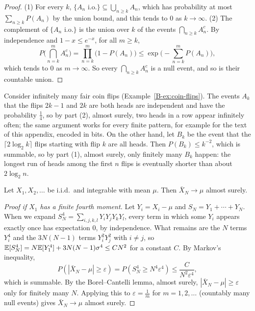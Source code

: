 \begin{proof}
    (1) For every $k$, $\{A_n \text{ i.o.}\} \subseteq \bigcup_{n \geq k} A_n$, which has probability at most $\sum_{n \geq k} P(A_n)$ by the union bound, and this tends to $0$ as $k \to \infty$. (2) The complement of $\{A_n \text{ i.o.}\}$ is the union over $k$ of the events $\bigcap_{n \geq k} A_n^c$. By independence and $1 - x \leq e^{-x}$, for all $m \geq k$,
    \[P\Big(\bigcap_{n=k}^m A_n^c\Big) = \prod_{n=k}^m \big(1 - P(A_n)\big) \leq \exp\Big(-\sum_{n=k}^m P(A_n)\Big),\]
    which tends to $0$ as $m \to \infty$. So every $\bigcap_{n \geq k} A_n^c$ is a null event, and so is their countable union.
\end{proof}

\begin{example}\label{B-ex:borel-cantelli}
    Consider infinitely many fair coin flips (Example~\ref{B-ex:coin-flips}). The events $A_k$ that the flips $2k - 1$ and $2k$ are both heads are independent and have the probability $\frac{1}{4}$, so by part (2), almost surely, two heads in a row appear infinitely often; the same argument works for every finite pattern, for example for the text of this appendix, encoded in bits. On the other hand, let $B_k$ be the event that the $\lceil 2\log_2 k\rceil$ flips starting with flip $k$ are all heads. Then $P(B_k) \leq k^{-2}$, which is summable, so by part (1), almost surely, only finitely many $B_k$ happen: the longest run of heads among the first $n$ flips is eventually shorter than about $2\log_2 n$.
\end{example}

\begin{theorem}\label{B-thm:slln}
    Let $X_1, X_2, \ldots$ be i.i.d.\ and integrable with mean $\mu$. Then $\bar X_N \to \mu$ almost surely.
\end{theorem}

\begin{proof}[Proof if $X_1$ has a finite fourth moment]
    Let $Y_i = X_i - \mu$ and $S_N = Y_1 + \cdots + Y_N$. When we expand $S_N^4 = \sum_{i, j, k, l} Y_iY_jY_kY_l$, every term in which some $Y_i$ appears exactly once has expectation $0$, by independence. What remains are the $N$ terms $Y_i^4$ and the $3N(N - 1)$ terms $Y_i^2Y_j^2$ with $i \neq j$, so $\mathbb{E}[S_N^4] = N\mathbb{E}[Y_1^4] + 3N(N - 1)\sigma^4 \leq CN^2$ for a constant $C$. By Markov's inequality,
    \[P(|\bar X_N - \mu| \geq \varepsilon) = P(S_N^4 \geq N^4\varepsilon^4) \leq \frac{C}{N^2\varepsilon^4},\]
    which is summable. By the Borel--Cantelli lemma, almost surely, $|\bar X_N - \mu| \geq \varepsilon$ only for finitely many $N$. Applying this to $\varepsilon = \frac{1}{m}$ for $m = 1, 2, \ldots$ (countably many null events) gives $\bar X_N \to \mu$ almost surely.
\end{proof}

